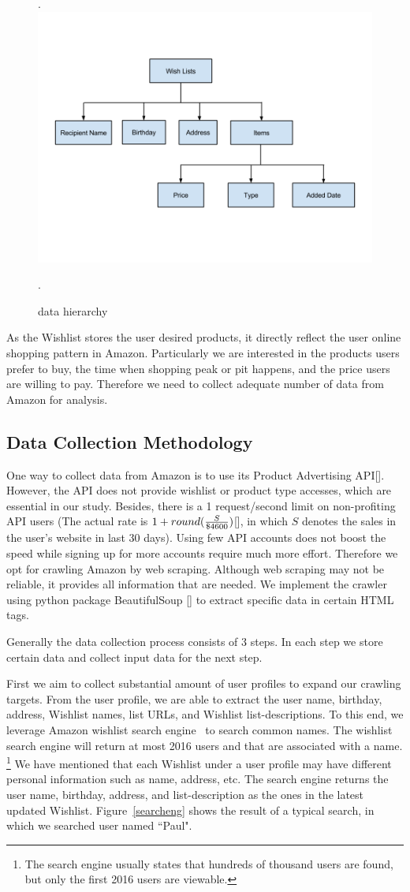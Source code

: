 \begin{figure}[h!].
\centering
\includegraphics[width=.45\textwidth]{data_struct.png}
\caption{data hierarchy}.
\label{data_struct}
\end{figure}

As the Wishlist stores the user desired products, it directly reflect the user online shopping pattern in Amazon. Particularly we are interested in the products users prefer to buy, the time when shopping peak or pit happens, and the price users are willing to pay. Therefore we need to collect adequate number of data from Amazon for analysis. 

\subsection{Data Collection Methodology}
One way to collect data from Amazon is to use its Product Advertising API[]. However, the API does not provide wishlist or product type accesses, which are essential in our study. Besides, there is a 1 request/second limit on non-profiting API users (The actual rate is $1 + round({S\over \$4600})$[], in which $S$ denotes the sales in the user's website in last 30 days). Using few API accounts does not boost the speed while signing up for more accounts require much more effort. Therefore we opt for crawling Amazon by web scraping. Although web scraping may not be reliable, it provides all information that are needed. We implement the crawler using python package BeautifulSoup [] to extract specific data in certain HTML tags. 

Generally the data collection process consists of 3 steps. In each step we store certain data and collect input data for the next step. 

First we aim to collect substantial amount of user profiles to expand our crawling targets. From the user profile, we are able to extract the user name, birthday, address, Wishlist names, list URLs, and Wishlist list-descriptions. To this end, we leverage Amazon wishlist search engine~\cite{searcheng} to search common names. The wishlist search engine will return at most 2016 users and that are associated with a name. \footnote {The search engine usually states that hundreds of thousand users are found, but only the first 2016 users are viewable.} We have mentioned that each Wishlist under a user profile may have different personal information such as name, address, etc. The search engine returns the user name, birthday, address, and list-description as the ones in the latest updated Wishlist. Figure~\ref{searcheng} shows the result of a typical search, in which we searched user named ``Paul".


